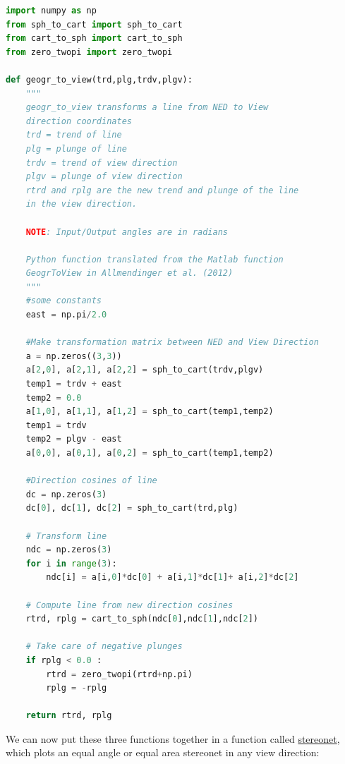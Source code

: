 \documentclass[a4paper , 12pt]{book}
\begin{document}
\begin{center}
\begin{lstlisting}[language=Python, frame=single]
import numpy as np
from sph_to_cart import sph_to_cart
from cart_to_sph import cart_to_sph
from zero_twopi import zero_twopi

def geogr_to_view(trd,plg,trdv,plgv):
	"""
	geogr_to_view transforms a line from NED to View 
	direction coordinates
	trd = trend of line
	plg = plunge of line 
	trdv = trend of view direction 
	plgv = plunge of view direction 
	rtrd and rplg are the new trend and plunge of the line
	in the view direction.
	
	NOTE: Input/Output angles are in radians
	
	Python function translated from the Matlab function
	GeogrToView in Allmendinger et al. (2012)
	"""
	#some constants 
	east = np.pi/2.0
	
	#Make transformation matrix between NED and View Direction
	a = np.zeros((3,3))
	a[2,0], a[2,1], a[2,2] = sph_to_cart(trdv,plgv)
	temp1 = trdv + east
	temp2 = 0.0
	a[1,0], a[1,1], a[1,2] = sph_to_cart(temp1,temp2)
	temp1 = trdv
	temp2 = plgv - east
	a[0,0], a[0,1], a[0,2] = sph_to_cart(temp1,temp2)
	
	#Direction cosines of line
	dc = np.zeros(3)
	dc[0], dc[1], dc[2] = sph_to_cart(trd,plg)
	
	# Transform line
	ndc = np.zeros(3)
	for i in range(3):
		ndc[i] = a[i,0]*dc[0] + a[i,1]*dc[1]+ a[i,2]*dc[2]
	
	# Compute line from new direction cosines
	rtrd, rplg = cart_to_sph(ndc[0],ndc[1],ndc[2])
	
	# Take care of negative plunges
	if rplg < 0.0 :
		rtrd = zero_twopi(rtrd+np.pi)
		rplg = -rplg
	
	return rtrd, rplg
\end{lstlisting}
\end{center}

We can now put these three functions together in a function called \href{https://github.com/nfcd/compGeo/blob/master/source/functions/stereonet.py}{stereonet}, which plots an equal angle or equal area stereonet in any view direction:
\end{document}
